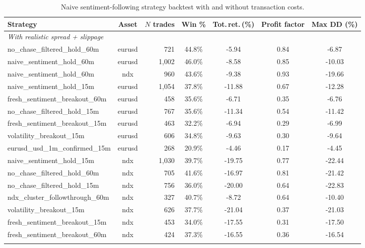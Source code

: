 \begin{table}[!htbp]
\centering
\caption{Naive sentiment-following strategy backtest with and without transaction costs.}
\label{tab:backtest}
\begin{threeparttable}
\footnotesize
\begin{tabular}{lcrcccc}
\toprule
\textbf{Strategy} & \textbf{Asset} & \textbf{$N$ trades} & \textbf{Win \%} & \textbf{Tot.\,ret.\,(\%)} & \textbf{Profit factor} & \textbf{Max DD (\%)} \\
\midrule
\multicolumn{7}{l}{\textit{With realistic spread + slippage}} \\
no\_chase\_filtered\_hold\_60m & eurusd & 721 & 44.8\% & -5.94 & 0.84 & -6.87 \\
naive\_sentiment\_hold\_60m & eurusd & 1,002 & 46.0\% & -8.58 & 0.85 & -10.03 \\
naive\_sentiment\_hold\_60m & ndx & 960 & 43.6\% & -9.38 & 0.93 & -19.66 \\
naive\_sentiment\_hold\_15m & eurusd & 1,054 & 37.8\% & -11.88 & 0.67 & -12.28 \\
fresh\_sentiment\_breakout\_60m & eurusd & 458 & 35.6\% & -6.71 & 0.35 & -6.76 \\
no\_chase\_filtered\_hold\_15m & eurusd & 767 & 35.6\% & -11.34 & 0.54 & -11.42 \\
fresh\_sentiment\_breakout\_15m & eurusd & 463 & 32.2\% & -6.94 & 0.29 & -6.99 \\
volatility\_breakout\_15m & eurusd & 606 & 34.8\% & -9.63 & 0.30 & -9.64 \\
eurusd\_usd\_1m\_confirmed\_15m & eurusd & 268 & 20.9\% & -4.46 & 0.17 & -4.45 \\
naive\_sentiment\_hold\_15m & ndx & 1,030 & 39.7\% & -19.75 & 0.77 & -22.44 \\
no\_chase\_filtered\_hold\_60m & ndx & 705 & 41.6\% & -16.97 & 0.81 & -21.42 \\
no\_chase\_filtered\_hold\_15m & ndx & 756 & 36.0\% & -20.00 & 0.64 & -22.83 \\
ndx\_cluster\_followthrough\_60m & ndx & 327 & 40.7\% & -8.72 & 0.64 & -10.40 \\
volatility\_breakout\_15m & ndx & 626 & 37.7\% & -21.04 & 0.37 & -21.03 \\
fresh\_sentiment\_breakout\_15m & ndx & 453 & 34.0\% & -17.55 & 0.31 & -17.50 \\
fresh\_sentiment\_breakout\_60m & ndx & 424 & 37.3\% & -16.55 & 0.36 & -16.54 \\
\addlinespace
\multicolumn{7}{l}{\textit{Without transaction costs (frictionless)}} \\

\end{tabular}
\end{threeparttable}
\end{table}
